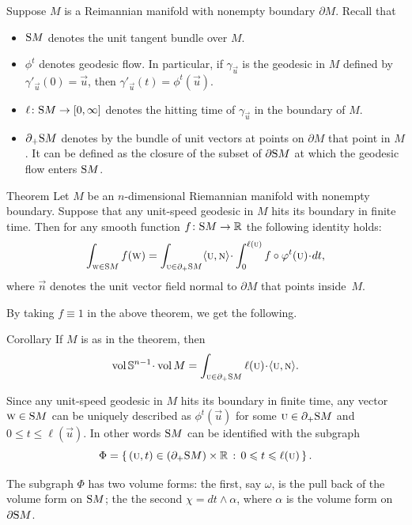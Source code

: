 Suppose $M$ is a Reimannian manifold with nonempty boundary $\partial M$.
Recall that 
\begin{itemize}
\item $\S M$ denotes the unit tangent bundle over $M$.
\item $\phi^t$ denotes geodesic flow.
In particular, if $\gamma_{\vec u}$ is the geodesic in $M$ defined by $\gamma'_{\vec u}(0)=\vec u$, then $\gamma'_{\vec u}(t)=\phi^t(\vec u)$.
\item $\ell\:\S M\to [0,\infty]$ denotes the hitting time of $\gamma_{\vec u}$ in the boundary of $M$.
\item $\partial_+\S  M$ denotes by the bundle of unit vectors at points on $\partial M$ that point in $M$. It can be defined as the closure of the subset of $\partial \S M$ at which the geodesic flow enters $\S M$.

\end{itemize}

\begin{thm}{Theorem}\label{thm:santalo}
Let $M$ be an $n$-dimensional Riemannian manifold with nonempty boundary.
Suppose that any unit-speed geodesic in $M$ hits its boundary in finite time.
Then for any smooth function $f\:\S M\to\RR$ the following identity holds:
\[\int_{\vec w\in \S M}f(\vec w)
=
\int_{\vec u\in \partial_+\S  M} 
\langle\vec u,\vec n\rangle\cdot
\int_0^{\ell(\vec u)} f\circ\phi^t(\vec u)\cdot dt,\]
where $\vec n$ denotes the unit vector field normal to $\partial M$ that points inside~$M$.
\end{thm}

By taking $f\equiv 1$ in the above theorem, we get the following.


\begin{thm}{Corollary}
If $M$ is as in the theorem, then
 \[\vol\SSS^{n-1}\cdot\vol M=\int_{\vec u\in \partial_+\S  M} \ell(\vec u)\cdot\langle\vec u,\vec n\rangle.\]
\end{thm}


Since any unit-speed geodesic in $M$ hits its boundary in finite time,
any vector $\vec w\in\S M$ can be uniquely described as $\phi^t(\vec u)$ for some $\vec u\in \partial_+\S  M$ and $0\le t\le \ell(\vec u)$.
In other words $\S M$ can be identified with the subgraph 
\[\Phi=\set{(\vec u,t)\in (\partial_+\S  M)\times \RR}{0\le t\le \ell(\vec u)}.\]

The subgraph $\Phi$ has two volume forms: the first, say $\omega$, is the pull back of the volume form  on $\S M$;
the the second $\chi=dt \wedge \alpha$, where $\alpha$ is the volume form on $\partial\S  M$.

